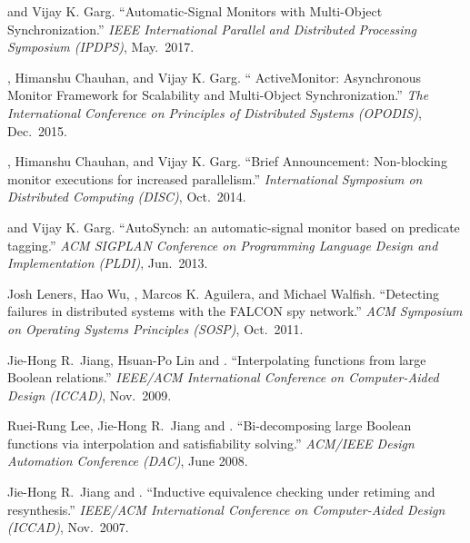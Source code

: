 

\begin{myenumerate}
    \item {} and Vijay K. Garg. ``Automatic-Signal Monitors
      with Multi-Object Synchronization.'' {\it IEEE International Parallel and 
    Distributed Processing Symposium (IPDPS)}, May.~2017. 

    \item {}, Himanshu Chauhan, and Vijay K. Garg. ``
      ActiveMonitor: Asynchronous Monitor Framework for Scalability and
      Multi-Object Synchronization.'' {\it The International Conference on
      Principles of Distributed Systems (OPODIS)}, Dec.~2015. 

    \item {}, Himanshu Chauhan, and Vijay K. Garg. ``Brief
        Announcement: Non-blocking monitor executions for increased
        parallelism.'' {\it International Symposium on Distributed Computing (DISC)},
        Oct.~2014. 
    \item {} and Vijay K. Garg. ``AutoSynch: an
        automatic-signal monitor based on predicate tagging.'' {\it ACM SIGPLAN
        Conference on Programming Language Design and Implementation (PLDI)},
        Jun.~2013. 
    \item Josh Leners, Hao Wu, , Marcos K. Aguilera, and 
        Michael Walfish. ``Detecting failures in distributed systems with the 
        FALCON spy network.'' {\it ACM Symposium on Operating Systems 
        Principles (SOSP)}, Oct.~2011.
    \item Jie-Hong R.~Jiang, Hsuan-Po Lin and  .
        ``Interpolating functions from large Boolean relations.'' {\it  
        IEEE/ACM International Conference on Computer-Aided Design (ICCAD)},  
        Nov.~2009.
    \item Ruei-Rung Lee, Jie-Hong R.~Jiang and . 
        ``Bi-decomposing large Boolean functions via interpolation and 
        satisfiability solving.'' {\it ACM/IEEE Design Automation Conference 
        (DAC)}, June 2008. %
    \item Jie-Hong R.~Jiang and . ``Inductive equivalence 
        checking under retiming and resynthesis.'' {\it IEEE/ACM International 
        Conference on Computer-Aided Design (ICCAD)}, Nov.~2007.
\end{myenumerate}
